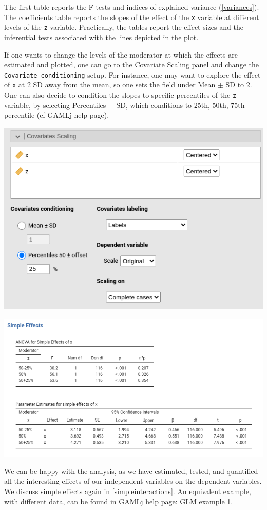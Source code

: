 \documentclass[
]{book}
\begin{document}
The first table reports the F-tests and indices of explained variance (\ref{variances}). The coefficients table reports the slopes of the effect of the \texttt{x} variable at different levels of the \texttt{z} variable. Practically, the tables report the effect sizes and the inferential tests associated with the lines depicted in the plot.

If one wants to change the levels of the moderator at which the effects are estimated and plotted, one can go to the {Covariate Scaling} panel and change the \texttt{Covariate\ conditioning} setup. For instance, one may want to explore the effect of \texttt{x} at 2 SD away from the mean, so one sets the field under Mean \(\pm\) SD to 2. One can also decide to condition the slopes to specific percentiles of the \texttt{z} variable, by selecting Percentiles \(\pm\) SD, which conditions to 25th, 50th, 75th percentile (cf GAMLj help page).

\includegraphics[width=0.7\linewidth]{bookletpics/2_input14}

\includegraphics[width=0.9\linewidth]{bookletpics/2_output14}

We can be happy with the analysis, as we have estimated, tested, and quantified all the interesting effects of our independent variables on the dependent variables. We discuss simple effects again in \ref{simpleinteractions}. An equivalent example, with different data, can be found in GAMLj help page: GLM example 1.
\end{document}
